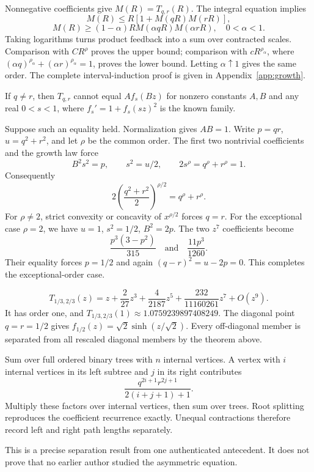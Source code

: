 \documentclass[11pt,oneside,openany]{book}
\begin{document}
Nonnegative coefficients give $M(R)=T_{q,r}(R)$. The integral equation implies
\[
M(R)\le R[1+M(qR)M(rR)],
\]
\[
M(R)\ge(1-\alpha)R M(\alpha qR)M(\alpha rR),\quad0<\alpha<1.
\]
Taking logarithms turns product feedback into a sum over contracted scales.
Comparison with $CR^\rho$ proves the upper bound; comparison with
$cR^{\rho_\alpha}$, where $(\alpha q)^{\rho_\alpha}+
(\alpha r)^{\rho_\alpha}=1$, proves the lower bound. Letting $\alpha\uparrow1$
gives the same order. The complete interval-induction proof is given in Appendix~\ref{app:growth}.



If $q\ne r$, then $T_{q,r}$ cannot equal $A f_s(Bz)$ for nonzero constants
$A,B$ and any real $0<s<1$, where $f_s'=1+f_s(sz)^2$ is the known family.

Suppose such an equality held. Normalization gives $AB=1$. Write $p=qr$,
$u=q^2+r^2$, and let $\rho$ be the common order. The first two nontrivial
coefficients and the growth law force
\[
B^2s^2=p,\qquad s^2=u/2,\qquad 2s^\rho=q^\rho+r^\rho=1.
\]
Consequently
\[
2\left(\frac{q^2+r^2}{2}\right)^{\rho/2}=q^\rho+r^\rho.
\]
For $\rho\ne2$, strict convexity or concavity of $x^{\rho/2}$ forces $q=r$.
For the exceptional case $\rho=2$, we have $u=1$, $s^2=1/2$, $B^2=2p$.
The two $z^7$ coefficients become
\[
\frac{p^3(3-p^2)}{315}\quad\text{and}\quad\frac{11p^3}{1260}.
\]
Their equality forces $p=1/2$ and again $(q-r)^2=u-2p=0$.
This completes the exceptional-order case.

\[
T_{1/3,2/3}(z)=z+\frac{2}{27}z^3+
\frac{4}{2187}z^5+\frac{232}{11160261}z^7+O(z^9).
\]
It has order one, and $T_{1/3,2/3}(1)\approx1.0759239897408249$.
The diagonal point $q=r=1/2$ gives
$f_{1/2}(z)=\sqrt2\sinh(z/\sqrt2)$. Every off-diagonal member is separated
from all rescaled diagonal members by the theorem above.

Sum over full ordered binary trees with $n$ internal vertices. A vertex with
$i$ internal vertices in its left subtree and $j$ in its right contributes
\[
\frac{q^{2i+1}r^{2j+1}}{2(i+j+1)+1}.
\]
Multiply these factors over internal vertices, then sum over trees. Root
splitting reproduces the coefficient recurrence exactly. Unequal contractions
therefore record left and right path lengths separately.

This is a precise separation result from one authenticated antecedent.
It does not prove that no earlier author studied the asymmetric equation.
\end{document}
